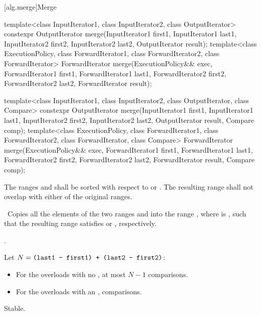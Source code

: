 [alg.merge]{Merge}

%
\begin{itemdecl}
template<class InputIterator1, class InputIterator2,
         class OutputIterator>
  constexpr OutputIterator
    merge(InputIterator1 first1, InputIterator1 last1,
          InputIterator2 first2, InputIterator2 last2,
          OutputIterator result);
template<class ExecutionPolicy, class ForwardIterator1, class ForwardIterator2,
         class ForwardIterator>
  ForwardIterator
    merge(ExecutionPolicy&& exec,
          ForwardIterator1 first1, ForwardIterator1 last1,
          ForwardIterator2 first2, ForwardIterator2 last2,
          ForwardIterator result);

template<class InputIterator1, class InputIterator2,
         class OutputIterator, class Compare>
  constexpr OutputIterator
    merge(InputIterator1 first1, InputIterator1 last1,
          InputIterator2 first2, InputIterator2 last2,
          OutputIterator result, Compare comp);
template<class ExecutionPolicy, class ForwardIterator1, class ForwardIterator2,
         class ForwardIterator, class Compare>
  ForwardIterator
    merge(ExecutionPolicy&& exec,
          ForwardIterator1 first1, ForwardIterator1 last1,
          ForwardIterator2 first2, ForwardIterator2 last2,
          ForwardIterator result, Compare comp);
\end{itemdecl}

\begin{itemdescr}
\pnum
\requires The ranges  and  shall be
sorted with respect to  or .
The resulting range shall not overlap with either of the original ranges.

\pnum
\effects\ Copies all the elements of the two ranges  and
 into the range , where 
is , such that the resulting range satisfies
 or , respectively.

\pnum
\returns
{}.

\pnum
\complexity Let $N = \texttt{(last1 - first1) + (last2 - first2)}$:
\begin{itemize}
\item For the overloads with no , at most $N - 1$ comparisons.
\item For the overloads with an ,  comparisons.
\end{itemize}

\pnum
\remarks Stable.
\end{itemdescr}

